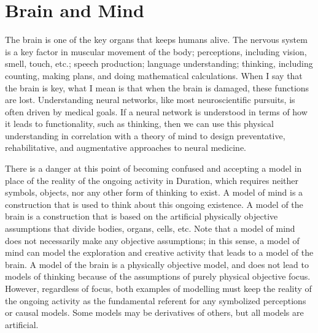 \section{Brain and Mind}

The brain is one of the key organs that keeps humans alive.  The
nervous system is a key factor in muscular movement of the body;
perceptions, including vision, smell, touch, etc.; speech production;
language understanding; thinking, including counting, making plans,
and doing mathematical calculations.  When I say that the brain is
key, what I mean is that when the brain is damaged, these functions
are lost.  Understanding neural networks, like most neuroscientific
pursuits, is often driven by medical goals.  If a neural network is
understood in terms of how it leads to functionality, such as
thinking, then we can use this physical understanding in correlation
with a theory of mind to design preventative, rehabilitative, and
augmentative approaches to neural medicine.

There is a danger at this point of becoming confused and accepting a
model in place of the reality of the ongoing activity in Duration,
which requires neither symbols, objects, nor any other form of
thinking to exist.  A model of mind is a construction that is used to
think about this ongoing existence.  A model of the brain is a
construction that is based on the artificial physically objective
assumptions that divide bodies, organs, cells, etc.  Note that a model
of mind does not necessarily make any objective assumptions; in this
sense, a model of mind can model the exploration and creative activity
that leads to a model of the brain.  A model of the brain is a
physically objective model, and does not lead to models of thinking
because of the assumptions of purely physical objective focus.
However, regardless of focus, both examples of modelling must keep the
reality of the ongoing activity as the fundamental referent for any
symbolized perceptions or causal models.  Some models may be
derivatives of others, but all models are artificial.

